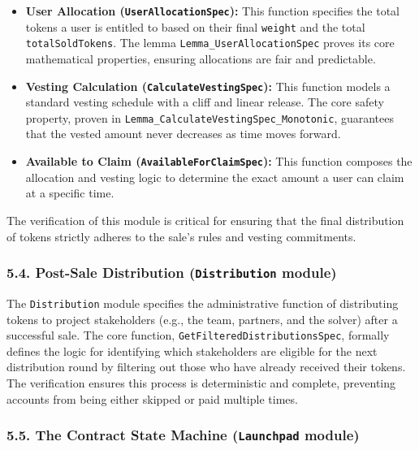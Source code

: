 \documentclass[
  english,
  onecolumn]{article}
\providecommand{\tightlist}{%
  \setlength{\itemsep}{0pt}\setlength{\parskip}{0pt}}
\begin{document}
\begin{itemize}
\tightlist
\item
  \textbf{User Allocation (\texttt{UserAllocationSpec}):} This function
  specifies the total tokens a user is entitled to based on their final
  \texttt{weight} and the total \texttt{totalSoldTokens}. The lemma
  \texttt{Lemma\_UserAllocationSpec} proves its core mathematical
  properties, ensuring allocations are fair and predictable.
\item
  \textbf{Vesting Calculation (\texttt{CalculateVestingSpec}):} This
  function models a standard vesting schedule with a cliff and linear
  release. The core safety property, proven in
  \texttt{Lemma\_CalculateVestingSpec\_Monotonic}, guarantees that the
  vested amount never decreases as time moves forward.
\item
  \textbf{Available to Claim (\texttt{AvailableForClaimSpec}):} This
  function composes the allocation and vesting logic to determine the
  exact amount a user can claim at a specific time.
\end{itemize}

The verification of this module is critical for ensuring that the final
distribution of tokens strictly adheres to the sale's rules and vesting
commitments.

\subsubsection{\texorpdfstring{5.4. Post-Sale Distribution
(\texttt{Distribution}
module)}{5.4. Post-Sale Distribution (Distribution module)}}\label{post-sale-distribution-distribution-module}

The \texttt{Distribution} module specifies the administrative function
of distributing tokens to project stakeholders (e.g., the team,
partners, and the solver) after a successful sale. The core function,
\texttt{GetFilteredDistributionsSpec}, formally defines the logic for
identifying which stakeholders are eligible for the next distribution
round by filtering out those who have already received their tokens. The
verification ensures this process is deterministic and complete,
preventing accounts from being either skipped or paid multiple times.

\subsubsection{\texorpdfstring{5.5. The Contract State Machine
(\texttt{Launchpad}
module)}{5.5. The Contract State Machine (Launchpad module)}}\label{the-contract-state-machine-launchpad-module}
\end{document}
